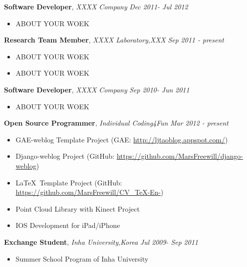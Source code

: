 \documentclass[paper=a4]{article}
\newenvironment{changemargin}[2]{%
  \begin{list}{}{%
    \setlength{\topsep}{0pt}%
    \setlength{\leftmargin}{#1}%
    \setlength{\rightmargin}{#2}%
    \setlength{\listparindent}{\parindent}%
    \setlength{\itemindent}{\parindent}%
    \setlength{\parsep}{\parskip}%
  }%
  \item[]}{\end{list}
}
\newenvironment{body} {
	\vspace*{-16pt}
	\begin{changemargin}{-0.5in}{-0.5in}
  }	
	{\end{changemargin}
}
\begin{document}
\begin{body}
	\vspace{14pt}
	\textbf{Software Developer}, \emph{XXXX Company} \hfill \emph{Dec 2011- Jul 2012}\\
	\vspace*{-4pt}
	\begin{itemize} \itemsep -0pt  %
		\item[\HandRight] ABOUT YOUR WOEK
	\end{itemize}

	\textbf {Research Team Member}, \emph{XXXX Laboratory,XXX} \hfill \emph{Sep 2011 - present}\\
	\vspace*{-4pt}
	\begin{itemize} \itemsep -0pt
	         \item[\HandRight] ABOUT YOUR WOEK
		\item[\HandRight] ABOUT YOUR WOEK
	\end{itemize}
	
	\textbf{Software Developer}, \emph{XXXX Company} \hfill \emph{Sep 2010- Jun 2011}\\
	\vspace*{-4pt}
	\begin{itemize} \itemsep -0pt  %
		\item[\HandRight] ABOUT YOUR WOEK
	\end{itemize}
	
	\textbf{Open Source Programmer}, \emph{Individual Coding4Fun} \hfill \emph{Mar 2012 - present}\\
	\vspace*{-4pt}
	\begin{itemize} \itemsep -0pt  %
		\item[\HandRight] GAE-weblog Template Project (GAE: \url{http://ljtaoblog.appspot.com/})
		\item[\HandRight] Django-weblog Project (GitHub: \url{https://github.com/MarsFreewill/django-weblog})
		\item[\HandRight] \LaTeX  \ Template Project (GitHub: \url{https://github.com/MarsFreewill/CV_TeX-En-})
		\item[\HandRight] Point Cloud Library with Kinect Project
		\item[\HandRight] IOS Development for iPad/iPhone
	\end{itemize}

	\textbf{Exchange Student}, \emph{Inha University,Korea} \hfill \emph{Jul 2009- Sep 2011}\\
	\vspace*{-4pt}
	\begin{itemize} \itemsep -0pt  %
		\item[\HandRight] Summer School Program of Inha University
	\end{itemize}
	
\end{body}
\end{document}
